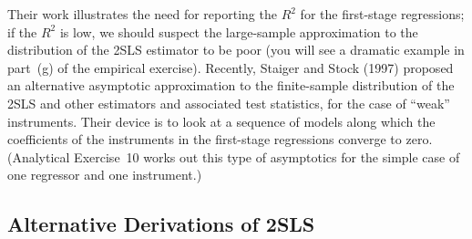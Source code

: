 Their work illustrates the need for reporting the $R^2$ for the first-stage regressions;
if the $R^2$ is low, we should suspect the large-sample approximation to the
distribution of the 2SLS estimator to be poor (you will see a dramatic example in
part~(g) of the empirical exercise).  Recently, Staiger and Stock (1997) proposed an
alternative asymptotic approximation to the finite-sample distribution of the 2SLS
and other estimators and associated test statistics, for the case of ``weak'' instruments.
Their device is to look at a sequence of models along which the coefficients
of the instruments in the first-stage regressions converge to zero.  (Analytical Exercise~10
works out this type of asymptotics for the simple case of one regressor and
one instrument.)

\subsection*{Alternative Derivations of 2SLS}

